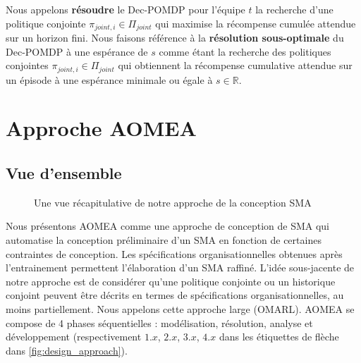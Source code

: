 \documentclass[contribution]{jfsma}
\begin{document}
Nous appelons \textbf{résoudre} le Dec-POMDP pour l'équipe $t$ la recherche d'une politique conjointe $\pi_{joint,i} \in \Pi_{joint}$ qui maximise la récompense cumulée attendue sur un horizon fini.
Nous faisons référence à la \textbf{résolution sous-optimale} du Dec-POMDP à une espérance de $s$ comme étant la recherche des politiques conjointes $\pi_{joint,i} \in \Pi_{joint}$ qui obtiennent la récompense cumulative attendue sur un épisode à une espérance minimale ou égale à $s \in \mathbb{R}$.



\section{Approche AOMEA}



\subsection{Vue d'ensemble}

\begin{figure}[h!]
  \centering
  
  \caption{Une vue récapitulative de notre approche de la conception SMA}
  \label{fig:design_approach}
\end{figure}

Nous présentons AOMEA comme une approche de conception de SMA qui automatise la conception préliminaire d'un SMA en fonction de certaines contraintes de conception. Les spécifications organisationnelles obtenues après l'entrainement permettent l’élaboration d’un SMA raffiné.
L’idée sous-jacente de notre approche est de considérer qu’une politique conjointe ou un historique conjoint peuvent être décrits en termes de spécifications organisationnelles, au moins partiellement.
Nous appelons cette approche large  (OMARL).
%
%
AOMEA se compose de 4 phases séquentielles : modélisation, résolution, analyse et développement (respectivement $1.x$, $2.x$, $3.x$, $4.x$ dans les étiquettes de flèche dans \autoref{fig:design_approach}).
\end{document}
